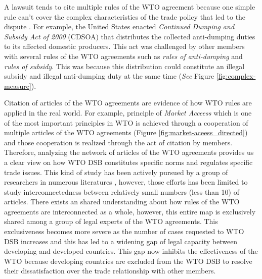 A lawsuit tends to cite multiple rules of the WTO agreement because one simple rule can't cover the complex characteristics of the trade policy that led to the dispute \citep{palmeter2004dispute}.
For example, the United States enacted \textit{Continued Dumping and Subsidy Act of 2000} (CDSOA) that distributes
the collected anti-dumping duties to its affected domestic producers.
This act was challenged by other members with several rules of
the WTO agreements such as \textit{rules of anti-dumping} and \textit{rules of subsidy}. This was because
this distribution could constitute an illegal subsidy and illegal anti-dumping duty at the same time (\textit{See} Figure \ref{fig:complex-measure}).
 
Citation of articles of the WTO agreements are evidence of how WTO rules are applied in the real world.
For example, principle of \textit{Market Acceess} which is one of the most important principles in WTO is achieved through a cooperation of multiple articles of the WTO agreements (Figure \ref{fig:market-aceess_directed}) and those cooperation is realized through the act of citation by members.
Therefore, analyzing the network of articles of the WTO agreements provides us a clear view on how WTO DSB constitutes specific norms and regulates specific trade issues.
This kind of study has been actively pursued by a group of researchers in numerous literatures \citep{chadXXIII, charnovitz, Trachtman, who_gets}, however, those efforts has been limited to
study interconnectedness between relatively small numbers (less than 10) of articles. %
There exists an shared understanding about how rules of the WTO agreements are interconnected as a whole, however, this entire map is exclusively shared among a group of legal experts of the WTO agreements.
This exclusiveness becomes more severe as the number of cases requested to WTO DSB increases and this has led to a widening gap of legal capacity between developing and developed countries.
This gap now inhibits the effectiveness of the WTO because developing countries are excluded from the WTO DSB to resolve their dissatisfaction over the trade relationship with other members.
 
 
